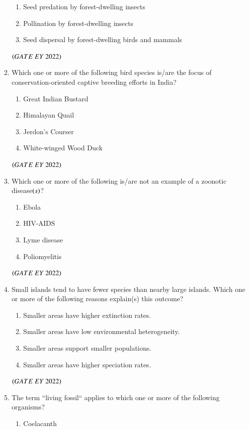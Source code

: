 \documentclass[journal]{IEEEtran}
\numberwithin{equation}{enumi}
\numberwithin{figure}{enumi}
\begin{document}
\begin{enumerate}
\begin{enumerate}
        \item  Seed predation by forest-dwelling insects
        \item  Pollination by forest-dwelling insects
        \item  Seed dispersal by forest-dwelling birds and mammals
    \end{enumerate}
    \hfill{$\brak{ GATE\ EY\ 2022}$}
    \bigskip
 \item Which one or more of the following bird species is/are the focus of
conservation-oriented captive breeding efforts in India?
    \begin{enumerate}
        \item  Great Indian Bustard
        \item  Himalayan Quail
        \item  Jerdon's Courser
        \item  White-winged Wood Duck
    \end{enumerate}
    \hfill{$\brak{ GATE\ EY\ 2022}$}
    \bigskip
 \item Which one or more of the following is/are not an example of a zoonotic
disease$\left(s\right)$?
    \begin{enumerate}
        \item  Ebola
        \item  HIV-AIDS
        \item  Lyme disease
        \item  Poliomyelitis
    \end{enumerate}
    \hfill{$\brak{ GATE\ EY\ 2022}$}
    \bigskip
 \item   Small islands tend to have fewer species than nearby large islands. Which one or
more of the following reasons explain(s) this outcome?
    \begin{enumerate}
        \item  Smaller areas have higher extinction rates.
        \item  Smaller areas have low environmental heterogeneity.
        \item  Smaller areas support smaller populations.
        \item  Smaller areas have higher speciation rates.
    \end{enumerate}
    \hfill{$\brak{ GATE\ EY\ 2022}$}
    \bigskip
 \item The term ``living fossil`` applies to which one or more of the following organisms?
    \begin{enumerate}
        \item  Coelacanth

\end{enumerate}
\end{enumerate}
\end{document}
